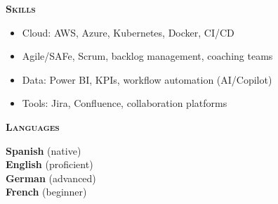 \documentclass[11pt, a4paper]{article}
\newcommand{\headleft}[1]{\vspace*{2ex}\textsc{\textbf{\color{softwhite}#1}}\par%
  \vspace*{-1.2ex}{\color{softwhite}\hrulefill}\par\vspace*{0.7ex}}
\begin{document}
{{\begin{minipage}[t]{\dimexpr\linewidth-8mm\relax}
      \headleft{Skills}
      \begin{itemize}[leftmargin=*, itemsep=0.5ex]
        \item Cloud: AWS, Azure, Kubernetes, Docker, CI/CD
        \item Agile/SAFe, Scrum, backlog management, coaching teams
        \item Data: Power BI, KPIs, workflow automation (AI/Copilot)
        \item Tools: Jira, Confluence, collaboration platforms
      \end{itemize}

      \headleft{Languages}
      \textbf{Spanish} (native) \\[0.5ex]
      \textbf{English} (proficient) \\[0.5ex]
      \textbf{German} (advanced) \\[0.5ex]
      \textbf{French} (beginner)
    \end{minipage}
  }%
}%
\hspace{3mm}%
\end{document}
